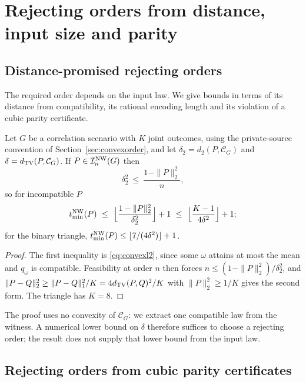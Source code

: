 \section{Rejecting orders from distance, input size and parity}\label{sec:input}

\subsection{Distance-promised rejecting orders}\label{sec:general}

The required order depends on the input law. We give bounds in terms of its distance from compatibility, its rational encoding length and its violation of a cubic parity certificate.

\begin{corollary}\label{prop:promised}
Let $G$ be a correlation scenario with $K$ joint outcomes, using the private-source convention of Section~\ref{sec:convexorder}, and let $\delta_2=d_2(P,\mathcal C_G)$ and $\delta=d_{\operatorname{TV}}(P,\mathcal C_G)$. If $P\in\mathcal I^{\mathrm{NW}}_n(G)$ then
\begin{equation}\label{eq:nw-rate}
\delta_2^2\ \le\ \frac{1-\|P\|_2^2}{n},
\end{equation}
so for incompatible $P$
\[
\tmin^{\mathrm{NW}}(P)\ \le\ \Bigl\lfloor\frac{1-\|P\|_2^2}{\delta_2^2}\Bigr\rfloor+1\ \le\ \Bigl\lfloor\frac{K-1}{4\delta^2}\Bigr\rfloor+1 ;
\]
for the binary triangle, $t_{\min}^{\mathrm{NW}}(P)\le\lfloor7/(4\delta^2)\rfloor+1$.
\end{corollary}

\begin{proof}
The first inequality is \eqref{eq:convexl2}, since some $\omega$ attains at most the mean and $q_\omega$ is compatible. Feasibility at order $n$ then forces $n\le(1-\|P\|_2^2)/\delta_2^2$, and $\|P-Q\|_2^2\ge\|P-Q\|_1^2/K=4d_{\operatorname{TV}}(P,Q)^2/K$ with $\|P\|_2^2\ge1/K$ gives the second form. The triangle has $K=8$.
\end{proof}

The proof uses no convexity of $\mathcal C_G$: we extract one compatible law from the witness. A numerical lower bound on $\delta$ therefore suffices to choose a rejecting order; the result does not supply that lower bound from the input law.



\subsection{Rejecting orders from cubic parity certificates}\label{sec:cubicorder}

